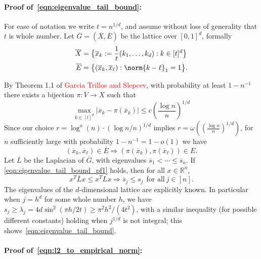 \documentclass{article}
\newcommand{\Reals}{\mathbb{R}}
\newcommand{\abs}[1]{\left \lvert #1 \right \rvert}
\newcommand{\1}{\mathbf{1}}
\theoremstyle{alden}
\theoremstyle{aldenthm}
\theoremstyle{definition}
\theoremstyle{remark}
\begin{document}
\paragraph{Proof of~\eqref{eqn:eigenvalue_tail_bound}:}

For ease of notation we write $t = n^{1/d}$, and assume without loss of generality that $t$ is whole number. Let $\overline{G} = (\overline{X},\overline{E})$ be the lattice over $[0,1]^d$, formally
\begin{align*}
\overline{X} & = \bigl\{\overline{x}_k := \frac{1}{t}(k_1,\ldots,k_d): k \in [t]^d\bigr\} \\
\overline{E} & = \bigl\{(\overline{x}_k, \overline{x}_{\ell}): \norm{k - \ell}_1 = 1\bigr\}.
\end{align*}

By Theorem 1.1 of \textcolor{red}{Garcia Trillos and Slepcev}, with probability at least $1 - n^{-1}$ there exists a bijection $\pi: \overline{V} \to X$ such that
\begin{equation}
\label{eqn:transport_distance}
\max_{k \in [t]^d} \abs{\overline{x}_k - \pi(\overline{x}_k)} \leq c \left(\frac{\log n}{n}\right)^{1/d}
\end{equation}
Since our choice $r = \log^a(n) \cdot (\log n/n)^{1/d}$ implies $r = \omega(\left(\frac{\log n}{n}\right)^{1/d})$, for $n$ sufficiently large with probability $1 - n^{-1} = 1 - o(1)$ we have
\begin{equation}
\label{eqn:eigenvalue_tail_bound_pf1}
(\overline{x}_k,\overline{x}_{\ell}) \in \overline{E} \Longrightarrow (\pi(\overline{x}_k),\pi(\overline{x}_{\ell})) \in E.
\end{equation}
Let $\overline{L}$ be the Laplacian of $\overline{G}$, with eigenvalues $\overline{s}_1 < \cdots \leq \overline{s}_n$. If \eqref{eqn:eigenvalue_tail_bound_pf1} holds, then for all $x \in \Reals^n$,
\begin{equation*}
x^T \overline{L} x \leq x^T L x \Longrightarrow \overline{s}_j \leq s_j~~ \textrm{for all}~ j \in [n].
\end{equation*}
The eigenvalues of the $d$-dimensional lattice are explicitly known. In particular when $j = h^d$ for some whole number $h$, we have $s_j \geq \lambda_j = 4 d \sin^2(\pi h/2t) \geq \pi^2 h^2/ (4 t^2)$, with a similar inequality (for possible different constants) holding when $j^{1/d}$ is not integral; this shows~\eqref{eqn:eigenvalue_tail_bound}.


\paragraph{Proof of~\eqref{eqn:l2_to_empirical_norm}:}
\end{document}
